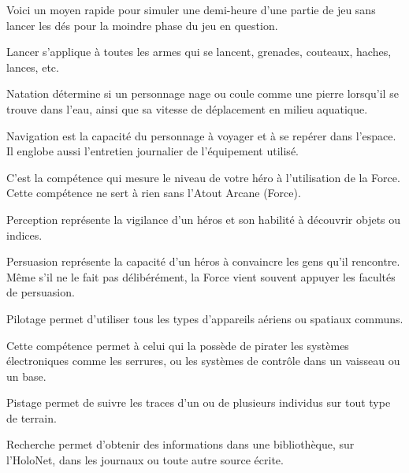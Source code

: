 \begin{description}[align=left]
    \item [Jeu (Int)]
        Voici un moyen rapide pour simuler une demi-heure d’une partie de jeu sans lancer les dés pour la moindre phase du jeu en question.

    \item [Lancer (Agi)]
        Lancer s’applique à toutes les armes qui se lancent, grenades, couteaux, haches, lances, etc.

    \item [Natation (Agi)]
        Natation détermine si un personnage nage ou coule comme une pierre lorsqu’il se trouve dans l’eau, ainsi que sa vitesse de déplacement en milieu aquatique.

    \item [Navigation (Int)]
        Navigation est la capacité du personnage à voyager et à se repérer dans l’espace. Il englobe aussi l’entretien journalier de l’équipement utilisé.

    \item [Maîtrise de la Force (\^Ame)]
        C’est la compétence qui mesure le niveau de votre héro à l’utilisation de la Force. Cette compétence ne sert à rien sans l’Atout Arcane (Force).

    \item [Perception (Int)]
        Perception représente la vigilance d’un héros et son habilité à découvrir objets ou indices.

    \item [Persuasion (\^Ame)]
        Persuasion représente la capacité d’un héros à convaincre les gens qu’il rencontre. Même s’il ne le fait pas délibérément, la Force vient souvent appuyer les facultés de persuasion.

    \item [Pilotage (Agi)]
        Pilotage permet d’utiliser tous les types d’appareils aériens ou spatiaux communs.

    \item [Piratage (Int)]
        Cette compétence permet à celui qui la possède de pirater les systèmes électroniques comme les serrures, ou les systèmes de contrôle dans un vaisseau ou un base.

    \item [Pistage (Int)]
        Pistage permet de suivre les traces d’un ou de plusieurs individus sur tout type de terrain.

    \item [Recherche (Int)]
        Recherche permet d’obtenir des informations dans une bibliothèque, sur l’HoloNet, dans les journaux ou toute autre source écrite.


\end{description}
